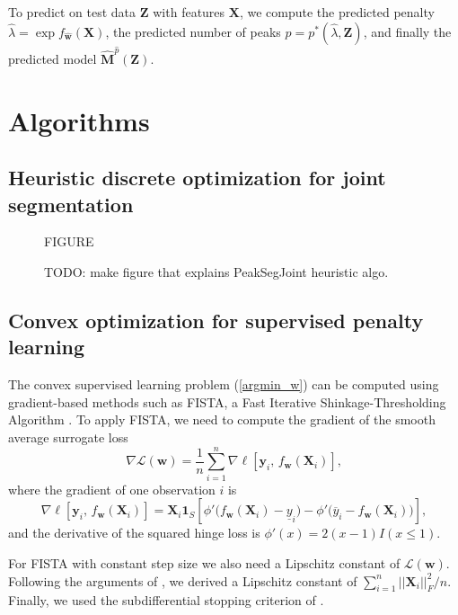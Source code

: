 \documentclass{article} %
\begin{document}
To predict on test data $\mathbf Z$ with features $\mathbf
X$, we compute the predicted penalty $\hat \lambda = \exp
f_{\mathbf{\hat w}}(\mathbf X)$, the predicted number of
peaks $\hat p = p^*(\hat \lambda, \mathbf Z)$, and finally the
predicted model $\mathbf{\hat M}^{\hat p}(\mathbf Z)$.

\section{Algorithms}

\subsection{Heuristic discrete optimization for joint segmentation}

\begin{figure}[b!]
  \centering
  FIGURE
  \caption{TODO: make figure that explains PeakSegJoint heuristic algo.}
  \label{fig:heuristic-algo}
\end{figure}

\subsection{Convex optimization for supervised penalty learning}

The convex supervised learning problem (\ref{argmin_w}) can be
computed using gradient-based methods such as FISTA, a Fast Iterative
Shinkage-Thresholding Algorithm \citep{fista}. To apply FISTA, we need
to compute the gradient of the smooth average surrogate loss
\begin{equation}
  \label{eq:average_gradient}
  \nabla \mathcal L(\mathbf w) = 
  \frac 1 n
  \sum_{i=1}^n 
  \nabla \ell \left[
    \mathbf y_i,\,
    f_{\mathbf w}(  \mathbf X_i )
  \right],
\end{equation}
where the gradient of one observation $i$ is
\begin{equation}
  \label{eq:one_gradient}
  \nabla \ell \left[
    \mathbf y_i,\,
    f_{\mathbf w}( \mathbf X_i )
  \right]
  =
  \mathbf X_i \mathbf 1_S
  \left[
    \phi'\big(
    f_{\mathbf w}( \mathbf X_i ) - \underline y_i
    \big)
    -
    \phi'\big(
    \overline y_i - f_{\mathbf w}( \mathbf X_i )
    \big)
  \right],
\end{equation}
and the derivative of the squared hinge loss is $\phi'(x)=2(x-1)I(x\leq 1)$.

For FISTA with constant step size we also need a Lipschitz constant of
$\mathcal L(\mathbf w)$. Following the arguments of
\citet{hingeSquareFISTA}, we derived a Lipschitz constant of
$\sum_{i=1}^n ||\mathbf X_i||_F^2/n$. Finally, we used the
subdifferential stopping criterion of \citet{HOCKING-penalties}.
\end{document}
